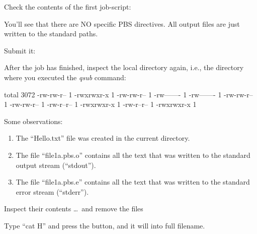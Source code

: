 Check the contents of the first job-script:


You'll see that there are NO specific PBS directives.  All output files are
just written to the standard paths.

Submit it:
\begin{prompt}
\end{prompt}

After the job has finished, inspect the local directory again, i.e., the
directory where you executed the \emph{qsub} command:

\begin{prompt}
total 3072
-rw-rw-r-- 1 %
-rwxrwxr-x 1 %
-rw-rw-r-- 1 %
-rw------- 1 %
-rw------- 1 %
-rw-rw-r-- 1 %
-rw-rw-r-- 1 %
-rw-r--r-- 1 %
-rwxrwxr-x 1 %
-rw-r--r-- 1 %
-rwxrwxr-x 1 %
\end{prompt}

Some observations:
\begin{enumerate}
\item The ``Hello.txt'' file was created in the current directory.
\item The file ``file1a.pbs.o\jobnumber'' contains all the text that was written to the standard output stream (``stdout'').
\item The file ``file1a.pbs.e\jobnumber'' contains all the text that was written to the standard error stream (``stderr'').
\end{enumerate}

Inspect their contents \dots\ and remove the files

\begin{prompt}
\end{prompt}

\begin{tip}
Type ``cat H'' and press the  button, and it will
 into full filename.
\end{tip}

